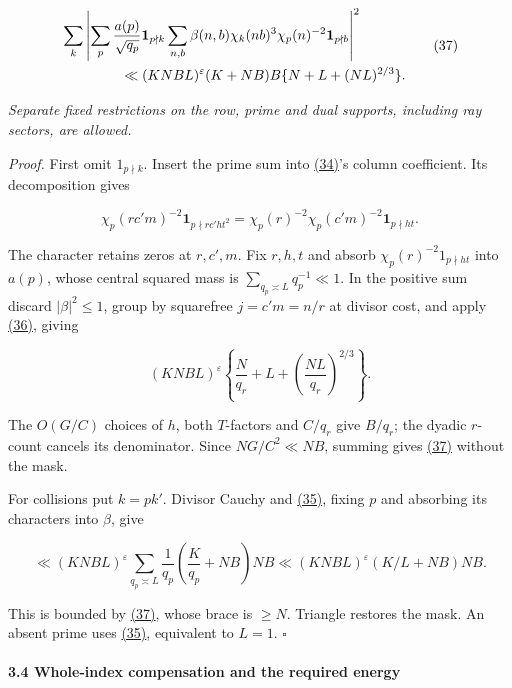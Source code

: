 \[
\begin{aligned}
 &\sum_k\left|\sum_p\frac{a(p)}{\sqrt{q_p}}\mathbf1_{p\nmid k}
 \sum_{n,b}\beta(n,b)\chi_k(nb)^3\chi_p(n)^{-2}\mathbf1_{p\nmid b}\right|^2\\
 &\hspace{15mm}\ll(KNBL)^\varepsilon(K+NB)B\{N+L+(NL)^{2/3}\}.
\end{aligned}
\qquad\text{(37)}
\]

\emph{Separate fixed restrictions on the row, prime and dual supports, including ray sectors, are allowed.}

\emph{Proof.} First omit \(1_{p\nmid k}\). Insert the prime sum into \protect\hyperlink{cf:eq:B.17}{(34)}'s column coefficient. Its decomposition gives

\[
\chi_p(rc'm)^{-2}\mathbf1_{p\nmid rc'ht^2}
 =\chi_p(r)^{-2}\chi_p(c'm)^{-2}\mathbf1_{p\nmid ht}.
\]

The character retains zeros at \(r,c',m\). Fix \(r,h,t\) and absorb \(\chi_p(r)^{-2}1_{p\nmid ht}\) into \(a(p)\), whose central squared mass is \(\sum_{q_p\asymp L}q_p^{-1}\ll1\). In the positive sum discard \(|\beta|^2\le1\), group by squarefree \(j=c'm=n/r\) at divisor cost, and apply \protect\hyperlink{cf:eq:B.19}{(36)}, giving

\[
(KNBL)^\varepsilon\left\{\frac N{q_r}+L+
                 \left(\frac{NL}{q_r}\right)^{2/3}\right\}.
\]

The \(O(G/C)\) choices of \(h\), both \(T\)-factors and \(C/q_r\) give \(B/q_r\); the dyadic \(r\)-count cancels its denominator. Since \(NG/C^2\ll NB\), summing gives \protect\hyperlink{cf:eq:B.20}{(37)} without the mask.

For collisions put \(k=pk'\). Divisor Cauchy and \protect\hyperlink{cf:eq:B.18}{(35)}, fixing \(p\) and absorbing its characters into \(\beta\), give

\[
\ll(KNBL)^\varepsilon\sum_{q_p\asymp L}\frac1{q_p}
       \left(\frac K{q_p}+NB\right)NB
 \ll(KNBL)^\varepsilon(K/L+NB)NB.
\]

This is bounded by \protect\hyperlink{cf:eq:B.20}{(37)}, whose brace is \(\ge N\). Triangle restores the mask. An absent prime uses \protect\hyperlink{cf:eq:B.18}{(35)}, equivalent to \(L=1\). \(\square\)

\hypertarget{cf:sec:B.4}{}

\label{cf:sec:B.4}

\hypertarget{whole-index-compensation-and-the-required-energy}{%
\paragraph{3.4 Whole-index compensation and the required energy}\label{whole-index-compensation-and-the-required-energy}}

